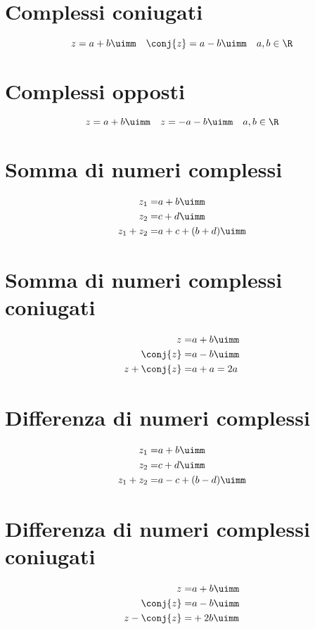 \section{Complessi coniugati}
\begin{equation}
z=a+b\uimm\quad\conj{z}=a-b\uimm\quad a,b\in\R
\end{equation}
\section{Complessi opposti}
\begin{equation}
z=a+b\uimm\quad\-z=-a-b\uimm\quad a,b\in\R
\end{equation}
\section{Somma di numeri complessi}
\begin{align}
z_1=&a+b\uimm\\
z_2=&c+d\uimm\\
z_1+z_2=&a+c+(b+d)\uimm
\end{align}
\section{Somma di numeri complessi coniugati}
\begin{align}
z=&a+b\uimm\\
\conj{z}=&a-b\uimm\\
z+\conj{z}=&a+a=2a
\end{align}
\section{Differenza di numeri complessi}
\begin{align}
z_1=&a+b\uimm\\
z_2=&c+d\uimm\\
z_1+z_2=&a-c+(b-d)\uimm
\end{align}
\section{Differenza di numeri complessi coniugati}
\begin{align}
z=&a+b\uimm\\
\conj{z}=&a-b\uimm\\
z-\conj{z}=&+2b\uimm
\end{align}
